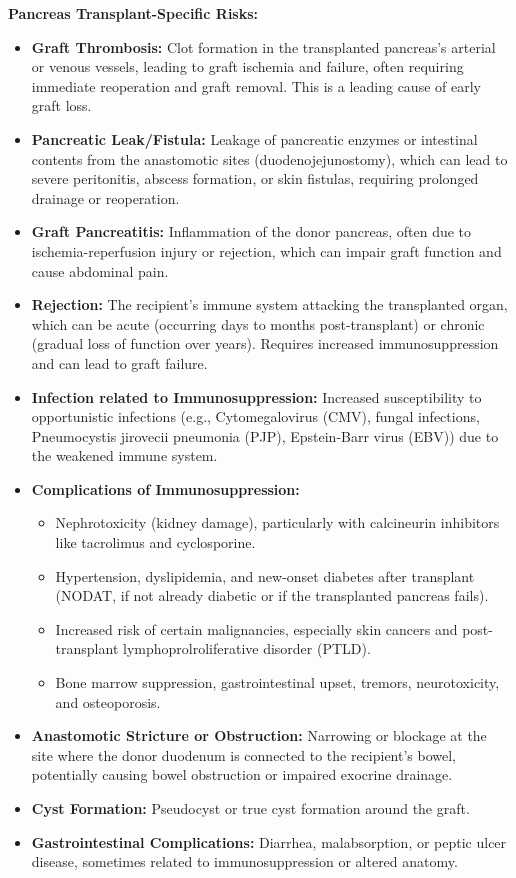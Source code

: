 \textbf{Pancreas Transplant-Specific Risks:}
\begin{itemize}
  \item \textbf{Graft Thrombosis:} Clot formation in the transplanted pancreas's arterial or venous vessels, leading to graft ischemia and failure, often requiring immediate reoperation and graft removal. This is a leading cause of early graft loss.
  \item \textbf{Pancreatic Leak/Fistula:} Leakage of pancreatic enzymes or intestinal contents from the anastomotic sites (duodenojejunostomy), which can lead to severe peritonitis, abscess formation, or skin fistulas, requiring prolonged drainage or reoperation.
  \item \textbf{Graft Pancreatitis:} Inflammation of the donor pancreas, often due to ischemia-reperfusion injury or rejection, which can impair graft function and cause abdominal pain.
  \item \textbf{Rejection:} The recipient's immune system attacking the transplanted organ, which can be acute (occurring days to months post-transplant) or chronic (gradual loss of function over years). Requires increased immunosuppression and can lead to graft failure.
  \item \textbf{Infection related to Immunosuppression:} Increased susceptibility to opportunistic infections (e.g., Cytomegalovirus (CMV), fungal infections, Pneumocystis jirovecii pneumonia (PJP), Epstein-Barr virus (EBV)) due to the weakened immune system.
  \item \textbf{Complications of Immunosuppression:}
    \begin{itemize}
      \item Nephrotoxicity (kidney damage), particularly with calcineurin inhibitors like tacrolimus and cyclosporine.
      \item Hypertension, dyslipidemia, and new-onset diabetes after transplant (NODAT, if not already diabetic or if the transplanted pancreas fails).
      \item Increased risk of certain malignancies, especially skin cancers and post-transplant lymphoprolroliferative disorder (PTLD).
      \item Bone marrow suppression, gastrointestinal upset, tremors, neurotoxicity, and osteoporosis.
    \end{itemize}
  \item \textbf{Anastomotic Stricture or Obstruction:} Narrowing or blockage at the site where the donor duodenum is connected to the recipient's bowel, potentially causing bowel obstruction or impaired exocrine drainage.
  \item \textbf{Cyst Formation:} Pseudocyst or true cyst formation around the graft.
  \item \textbf{Gastrointestinal Complications:} Diarrhea, malabsorption, or peptic ulcer disease, sometimes related to immunosuppression or altered anatomy.
\end{itemize}

